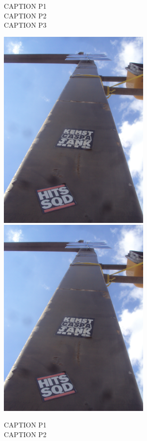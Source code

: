 \documentclass[10pt,letterpaper]{article}
\begin{document}
CAPTION P1\\
CAPTION P2\\
CAPTION P3\\
\pagebreak

\includegraphics[height=4in]{portrait.jpg}
\includegraphics[height=4in]{portrait.jpg}

CAPTION P1\\
CAPTION P2\\
\pagebreak
\end{document}
